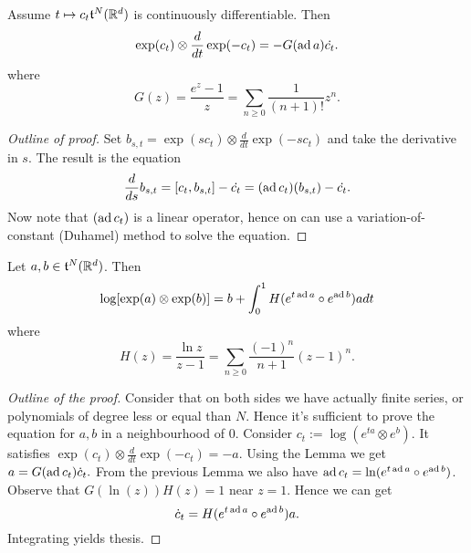 \begin{lemma}
    Assume \(t \mapsto c_t \mathfrak{t}^N(\mathbb{R}^d)\) is continuously differentiable.
    Then 
    \begin{equation}
        \exp(c_t) \otimes \frac{d}{dt} \exp(-c_t) = - G (\operatorname{ad} a) \dot{c_t}.
    \end{equation}
    where 
    \begin{equation}
        G(z) = \frac{e^z - 1}{z} = \sum_{n \ge 0} \frac{1}{(n+1)!} z^n.
    \end{equation}
\end{lemma}
\begin{proof}[Outline of proof]
    Set \( b_{s,t} = \exp(s c_t) \otimes \frac{d}{dt} \exp(-s c_t) \) and take the derivative in \(s\).
    The result is the equation
    \[
    \frac{d}{ds} b_{s,t} = [c_t, b_{s,t}] - \dot{c_t} = (\operatorname{ad} c_t) (b_{s,t}) - \dot{c_t}.
    \]
    Now note that \((\operatorname{ad} c_t)\) is a linear operator, hence on can use a variation-of-constant (Duhamel) method to solve the equation.
\end{proof}

\begin{theorem}
    Let \(a, b \in \mathfrak{t}^N(\mathbb{R}^d)\). Then
    \begin{equation}
        \log[\exp(a) \otimes \exp(b)] = b + \int_0^1 H(e^{t \operatorname{ad} a} \circ e^{\operatorname{ad} b}) a dt 
    \end{equation}
    where
    \begin{equation}
        H(z) = \frac{\ln z}{z - 1} = \sum_{n \ge 0} \frac{(-1)^n}{n + 1} (z - 1)^n.
    \end{equation}
\end{theorem}
\begin{proof}[Outline of the proof]
    Consider that on both sides we have actually finite series, or polynomials of degree less or equal than \(N\).
    Hence it's sufficient to prove the equation for \(a,b\) in a neighbourhood of \(0\).
    Consider \(c_t := \log(e^{ta} \otimes e^b).\)
    It satisfies \( \exp(c_t) \otimes \frac{d}{dt} \exp(-c_t) = -a.\)
    Using the Lemma we get \(a = G(\operatorname{ad} c_t) \dot{c}_t.\)
    From the previous Lemma we also have \( \operatorname{ad} c_t = \ln( e^{t \operatorname{ad} a} \circ e^{\operatorname{ad} b})\).
    Observe that \( G(\ln(z)) H(z) = 1\) near \(z = 1\). Hence we can get
    \[
        \dot{c}_t = H(e^{t \operatorname{ad} a} \circ e^{\operatorname{ad} b}) a.
    \]
    Integrating yields thesis.
\end{proof}